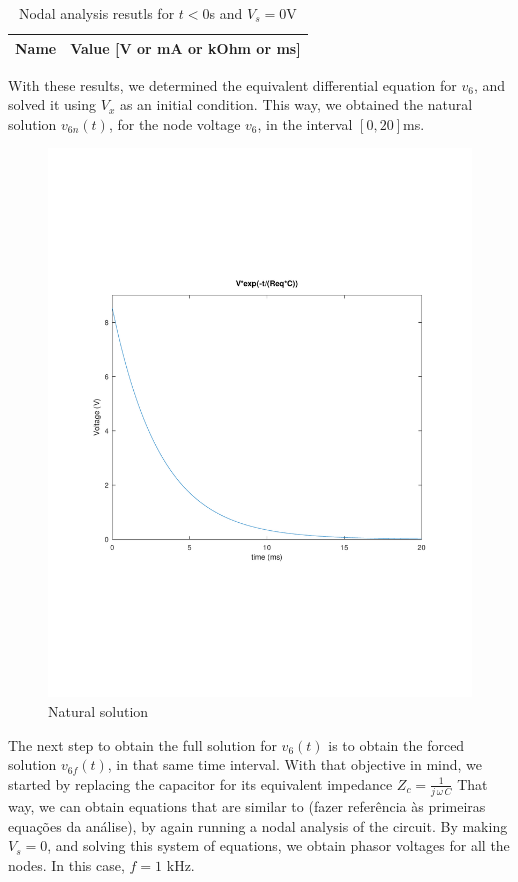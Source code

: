 \begin{table}[h!]
  \centering
  \begin{tabular}{|l|r|}
    \hline    
    {\bf Name} & {\bf Value [V or mA or kOhm or ms]} \\ \hline
    
    \hline
  \end{tabular}
  \caption{Nodal analysis resutls for $t < 0$s and $V_s = 0$V }
  \label{tab:Nodal2}
\end{table}


With these results, we determined the equivalent differential equation for $v_{6}$, and solved it using $V_x$ as an initial condition. This way, we obtained the natural solution $v_{6n}(t)$, for the node voltage $v_{6}$, in the interval $[0, 20]$ms. 





\begin{figure}[h!] \centering
\includegraphics[width=0.6\linewidth]{../mat/natural.pdf}
\caption{Natural solution}
\label{fig:TNatural}
\end{figure}


The next step to obtain the full solution for $v_6(t)$ is to obtain the forced solution $v_{6f}(t)$, in that same time interval. With that objective in mind, we started by replacing the capacitor for its equivalent impedance $Z_c=\frac{1}{j\,\omega \, C}$ That way, we can obtain equations that are similar to (fazer referência às primeiras equações da análise), by again running a nodal analysis of the circuit. By making $V_s=0$, and solving this system of equations, we obtain phasor voltages for all the nodes. In this case, $f=1$ kHz.

